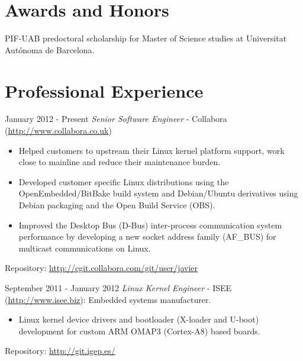 \documentclass{simplecv}
\begin{document}
\section{Awards and Honors}

PIF-UAB predoctoral scholarship for Master of Science studies at Universitat Autónoma de Barcelona.

\section{Professional Experience}

\begin{topic}

\item[January 2012 - Present] \emph{Senior Software Engineer} - Collabora (\url{http://www.collabora.co.uk})

\begin{itemize}

\item Helped customers to upstream their Linux kernel platform support, work close to mainline and reduce their maintenance burden.

\item Developed customer specific Linux distributions using the OpenEmbedded/BitBake build system and Debian/Ubuntu derivatives using Debian packaging and the Open Build Service (OBS).

\item Improved the Desktop Bus (D-Bus) inter-process communication system performance by developing a new socket address family (AF\_BUS) for multicast communications on Linux.

\end{itemize}

Repository: \url{http://cgit.collabora.com/git/user/javier}

\item[September 2011 - January 2012] \emph{Linux Kernel Engineer} - ISEE (\url{http://www.isee.biz}): Embedded systems manufacturer.

\begin{itemize}

\item Linux kernel device drivers and bootloader (X-loader and U-boot) development for custom ARM OMAP3 (Cortex-A8) based boards.

\end{itemize}

Repository: \url{http://git.igep.es/}


\end{topic}
\end{document}
